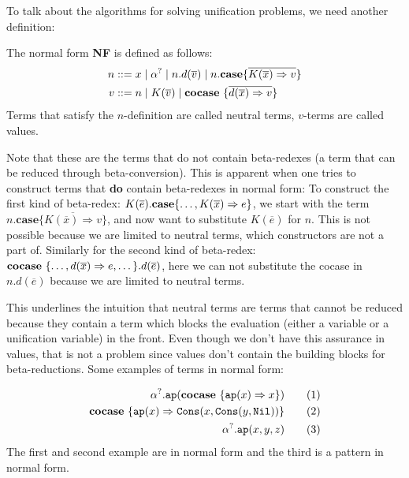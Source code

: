 \documentclass[twoside,12pt,a4paper]{article}
\begin{document}
To talk about the algorithms for solving unification problems, we need another definition: %
\begin{definition}
    The normal form \textbf{NF} is defined as follows:
    \begin{align*}
        n &::= x \;|\; \alpha^? \;|\; n.d(\overline{v})\;|\; n.\textbf{case}\{\overline{K(\overline{x})\Rightarrow v}\}\\
        v &::= n \;|\; K(\overline{v}) \;|\; \textbf{cocase}\ \{\overline{d(\overline{x})\Rightarrow v}\}
    \end{align*}
    Terms that satisfy the $n$-definition are called neutral terms, $v$-terms are called values.
\end{definition}
Note that these are the terms that do not contain beta-redexes (a term that can be reduced through beta-conversion).
This is apparent when one tries to construct terms that \textbf{do} contain beta-redexes in normal form: 
To construct the first kind of beta-redex: $K(\overline{e}).\textbf{case}\{\dots,K(\overline{x})\Rightarrow e\}$,
we start with the term $n.\textbf{case}\{\overline{K(\overline{x})\Rightarrow v}\}$, and now want to substitute $K(\overline{e})$ for $n$. 
This is not possible because we are limited to neutral terms, which constructors are not a part of.
Similarly for the second kind of beta-redex:
$\textbf{cocase}\ \{\dots,d(\overline{x}) \Rightarrow e, \dots\}.d(\overline{e})$, 
here we can not substitute the cocase in $n.d(\overline{e})$ because we are limited to neutral terms.
        
This underlines the intuition that neutral terms are terms that cannot be reduced because
they contain a term which blocks the evaluation (either a variable or a unification variable) in the front.
Even though we don't have this assurance in values, that is not a problem since values don't contain the building blocks for beta-reductions. 
Some examples of terms in normal form: 
\begin{example}
\begin{align*}
    \alpha^?.\texttt{ap}(\textbf{cocase}\ \{\texttt{ap}(x)\Rightarrow x\}) \tag{1}\\
    \textbf{cocase}\ \{\texttt{ap}(x)\Rightarrow \mathtt{Cons(\mathnormal{x}, Cons(\mathnormal{y}, Nil))}\} \tag{2}\\
    \alpha^?.\texttt{ap}(x, y, z) \tag{3}    
\end{align*}
The first and second example are in normal form and the third is a pattern in normal form.
\end{example}
\end{document}

